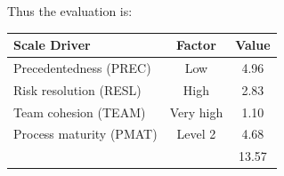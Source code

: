 \documentclass[a4paper]{article}
\begin{document}
Thus the evaluation is:
\begin{center}
\begin{tabular}{ | l | c | c | }
\hline
	\textbf{Scale Driver} & \textbf{Factor} & \textbf{Value}  \\ \hline\hline
	Precedentedness (PREC)& Low &  4.96 \\ \hline
	Risk resolution (RESL) & High & 2.83  \\ \hline
	Team cohesion (TEAM)  & Very high &  1.10  \\ \hline
	Process maturity (PMAT) &  Level 2 & 4.68 \\ \hline
         \multicolumn{1}{|l}{}Total &  & 13.57 \\ \hline
\end{tabular}
\end{center}
\end{document}
